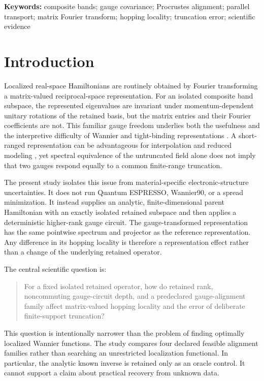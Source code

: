 \documentclass[11pt]{article}
\begin{document}
\noindent\textbf{Keywords:} composite bands; gauge covariance; Procrustes alignment;
parallel transport; matrix Fourier transform; hopping locality; truncation error;
scientific evidence

\section{Introduction}

Localized real-space Hamiltonians are routinely obtained by Fourier transforming a
matrix-valued reciprocal-space representation. For an isolated composite band subspace,
the represented eigenvalues are invariant under momentum-dependent unitary rotations of
the retained basis, but the matrix entries and their Fourier coefficients are not. This
familiar gauge freedom underlies both the usefulness and the interpretive difficulty of
Wannier and tight-binding representations
\cite{marzari1997,souzaMarzariVanderbilt2001,marzariEtAl2012}. A short-ranged
representation can be advantageous for interpolation and reduced modeling
\cite{yates2007}, yet spectral equivalence of the untruncated field alone does not imply
that two gauges respond equally to a common finite-range truncation.

The present study isolates this issue from material-specific electronic-structure
uncertainties. It does not run Quantum ESPRESSO, Wannier90, or a spread minimization. It
instead supplies an analytic, finite-dimensional parent Hamiltonian with an exactly
isolated retained subspace and then applies a deterministic higher-rank gauge circuit.
The gauge-transformed representation has the same pointwise spectrum and projector as the
reference representation. Any difference in its hopping locality is therefore a
representation effect rather than a change of the underlying retained operator.

The central scientific question is:

\begin{quote}
For a fixed isolated retained operator, how do retained rank, noncommuting gauge-circuit
depth, and a predeclared gauge-alignment family affect matrix-valued hopping
locality and the error of deliberate finite-support truncation?
\end{quote}

This question is intentionally narrower than the problem of finding optimally localized
Wannier functions. The study compares four declared feasible alignment families rather
than searching an unrestricted localization functional. In particular, the analytic
known inverse is retained only as an oracle control. It cannot support a claim about
practical recovery from unknown data.
\end{document}
